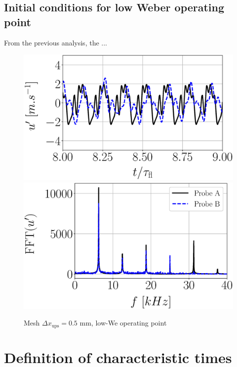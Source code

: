 \subsection{Initial conditions for low Weber operating point}

From the previous analysis, the ...



\begin{figure}[ht]
	\centering
   \includegraphics[scale=0.28]{./part2_developments/figures_ch5_resolved_JICF/results_ics_mesh_convergence_probes/up_OP2.eps}
   \includegraphics[scale=0.28]{./part2_developments/figures_ch5_resolved_JICF/results_ics_mesh_convergence_probes/spectra_linear_scale_OP2.eps}
   \caption{Mesh $\Delta x_\mathrm{ups} = 0.5$ mm, low-We operating point}
   \label{fig:ics_probes_OP2}
\end{figure}




\section{Definition of characteristic times}


